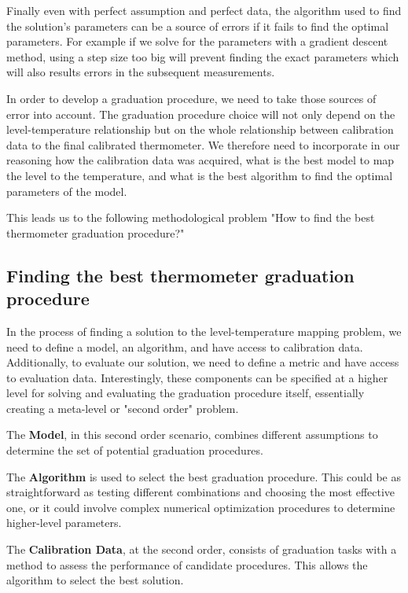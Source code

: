 \begin{bibunit}
 Finally even with perfect assumption and perfect data, the algorithm used to find the solution's parameters can be a source of errors if it fails to find the optimal parameters. For example if we solve for the parameters with a gradient descent method, using a step size too big will prevent finding the exact parameters which will also results errors in the subsequent measurements.

In order to develop a graduation procedure, we need to take those sources of error into account. The graduation procedure choice will not only depend on the level-temperature relationship but on the whole relationship between calibration data to the final calibrated thermometer. We therefore need to incorporate in our reasoning how the calibration data was acquired, what is the best model to map the level to the temperature, and what is the best algorithm to find the optimal parameters of the model.


This leads us to the following methodological problem "How to find the best thermometer graduation procedure?"

\subsection{Finding the best thermometer graduation procedure}
In the process of finding a solution to the level-temperature mapping problem, we need to define a model, an algorithm, and have access to calibration data. Additionally, to evaluate our solution, we need to define a metric and have access to evaluation data. Interestingly, these components can be specified at a higher level for solving and evaluating the graduation procedure itself, essentially creating a meta-level or "second order" problem.

The \textbf{Model}, in this second order scenario, combines different assumptions to determine the set of potential graduation procedures. %

The \textbf{Algorithm} is used to select the best graduation procedure. This could be as straightforward as testing different combinations and choosing the most effective one, or it could involve complex numerical optimization procedures to determine higher-level parameters.

The \textbf{Calibration Data}, at the second order, consists of graduation tasks with a method to assess the performance of candidate procedures. This allows the algorithm to select the best solution.


\end{bibunit}
